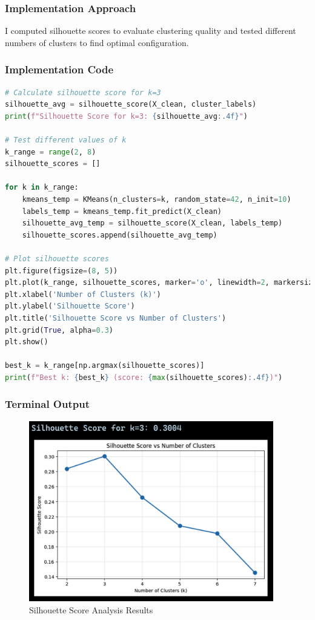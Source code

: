 \documentclass[12pt,a4paper]{article}
\begin{document}
\subsubsection{Implementation Approach}
I computed silhouette scores to evaluate clustering quality and tested different numbers of clusters to find optimal configuration.

\subsubsection{Implementation Code}
\begin{lstlisting}[language=Python, caption=Silhouette Score Analysis]
# Calculate silhouette score for k=3
silhouette_avg = silhouette_score(X_clean, cluster_labels)
print(f"Silhouette Score for k=3: {silhouette_avg:.4f}")

# Test different values of k
k_range = range(2, 8)
silhouette_scores = []

for k in k_range:
    kmeans_temp = KMeans(n_clusters=k, random_state=42, n_init=10)
    labels_temp = kmeans_temp.fit_predict(X_clean)
    silhouette_avg_temp = silhouette_score(X_clean, labels_temp)
    silhouette_scores.append(silhouette_avg_temp)

# Plot silhouette scores
plt.figure(figsize=(8, 5))
plt.plot(k_range, silhouette_scores, marker='o', linewidth=2, markersize=8)
plt.xlabel('Number of Clusters (k)')
plt.ylabel('Silhouette Score')
plt.title('Silhouette Score vs Number of Clusters')
plt.grid(True, alpha=0.3)
plt.show()

best_k = k_range[np.argmax(silhouette_scores)]
print(f"Best k: {best_k} (score: {max(silhouette_scores):.4f})")
\end{lstlisting}

\subsubsection{Terminal Output}
\begin{figure}[h!]
\centering
    \includegraphics[width=0.95\textwidth]{Figures/silhouette_analysis.png}
    \caption{Silhouette Score Analysis Results}
\end{figure}
\end{document}
